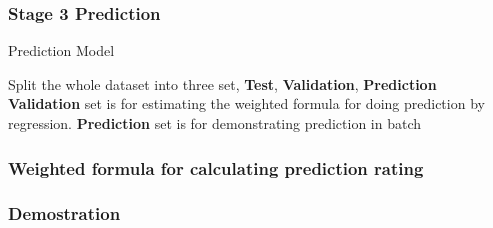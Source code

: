 \documentclass[11pt]{beamer}
\begin{document}
\begin{frame}
\frametitle{Stage 3 Prediction}

\begin{algorithm}[H]
	\caption{Prediction Model}
	Split the whole dataset into three set, \textbf{Test}, \textbf{Validation}, \textbf{Prediction}\;
	\textbf{Validation} set is for estimating the weighted formula for doing prediction by regression.\;
	\textbf{Prediction} set is for demonstrating prediction in batch\;
	
\end{algorithm}

\end{frame}

\begin{frame}
\frametitle{Weighted formula for calculating prediction rating}

\end{frame}

\begin{frame}
\frametitle{Demostration}

\end{frame}
\end{document}
